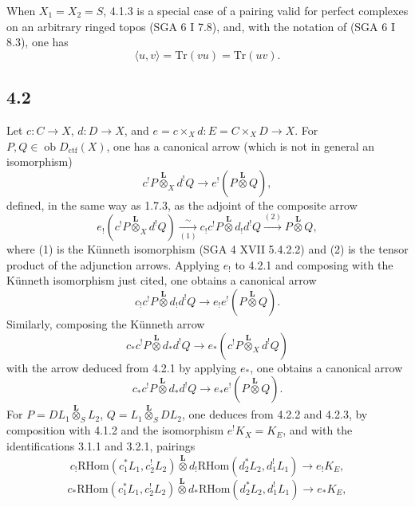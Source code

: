 \documentclass[11pt]{article}
\newcommand{\ob}{\operatorname{ob}}
\providecommand{\RHom}{\mathrm{RHom}}
\providecommand{\Dctf}{D_{\mathrm{ctf}}}
\providecommand{\Dctf}{D_{\mathrm{ctf}}}
\providecommand{\RHom}{\mathrm{RHom}}
\providecommand{\ob}{\operatorname{ob}}
\providecommand{\RHom}{\mathrm R\mathcal{H}om}
\begin{document}
When $X_1=X_2=S$, 4.1.3 is a special case of a pairing valid for perfect complexes on an arbitrary ringed topos (SGA 6 I 7.8), and, with the notation of (SGA 6 I 8.3), one has
\begin{equation}
\langle u,v\rangle=\mathrm{Tr}(vu)=\mathrm{Tr}(uv).
\tag{4.1.5}
\end{equation}

\subsection*{4.2}
Let $c:C\to X$, $d:D\to X$, and $e=c\times_Xd:E=C\times_XD\to X$. For $P,Q\in\ob\Dctf(X)$, one has a canonical arrow (which is not in general an isomorphism)
\begin{equation}
c^!P\overset{\mathbf L}{\otimes}_X d^!Q
\longrightarrow e^!(P\overset{\mathbf L}{\otimes}Q),
\tag{4.2.1}
\end{equation}
defined, in the same way as 1.7.3, as the adjoint of the composite arrow
\[
e_!(c^!P\overset{\mathbf L}{\otimes}_X d^!Q)
\xrightarrow[(1)]{\sim}
 c_!c^!P\overset{\mathbf L}{\otimes}d_!d^!Q
\xrightarrow{(2)} P\overset{\mathbf L}{\otimes}Q,
\]
where (1) is the Künneth isomorphism (SGA 4 XVII 5.4.2.2) and (2) is the tensor product of the adjunction arrows. Applying $e_!$ to 4.2.1 and composing with the Künneth isomorphism just cited, one obtains a canonical arrow
\begin{equation}
c_!c^!P\overset{\mathbf L}{\otimes}d_!d^!Q
\longrightarrow e_!e^!(P\overset{\mathbf L}{\otimes}Q).
\tag{4.2.2}
\end{equation}
Similarly, composing the Künneth arrow
\[
c_*c^!P\overset{\mathbf L}{\otimes}d_*d^!Q
\longrightarrow e_*(c^!P\overset{\mathbf L}{\otimes}_X d^!Q)
\]
with the arrow deduced from 4.2.1 by applying $e_*$, one obtains a canonical arrow
\begin{equation}
c_*c^!P\overset{\mathbf L}{\otimes}d_*d^!Q
\longrightarrow e_*e^!(P\overset{\mathbf L}{\otimes}Q).
\tag{4.2.3}
\end{equation}
For $P=DL_1\overset{\mathbf L}{\otimes}_S L_2$, $Q=L_1\overset{\mathbf L}{\otimes}_S DL_2$, one deduces from 4.2.2 and 4.2.3, by composition with 4.1.2 and the isomorphism $e^!K_X=K_E$, and with the identifications 3.1.1 and 3.2.1, pairings
\begin{equation}
c_!\RHom(c_1^*L_1,c_2^!L_2)\overset{\mathbf L}{\otimes}
 d_!\RHom(d_2^*L_2,d_1^!L_1)
\longrightarrow e_!K_E,
\tag{4.2.4}
\end{equation}
\begin{equation}
c_*\RHom(c_1^*L_1,c_2^!L_2)\overset{\mathbf L}{\otimes}
 d_*\RHom(d_2^*L_2,d_1^!L_1)
\longrightarrow e_*K_E,
\tag{4.2.4'}
\end{equation}
\end{document}
